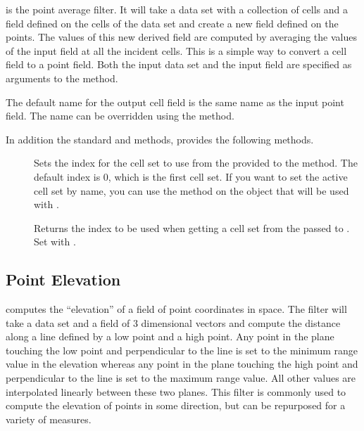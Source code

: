  is the point average filter.
It will take a data set with a collection of cells and a field defined on the cells of the data set and create a new field defined on the points.
The values of this new derived field are computed by averaging the values of the input field at all the incident cells.
This is a simple way to convert a cell field to a point field.
Both the input data set and the input field are specified as arguments to the  method.

The default name for the output cell field is the same name as the input point field.
The name can be overridden using the  method.

In addition the standard  and  methods,  provides the following methods.

\begin{description}
\item[]
  Sets the index for the cell set to use from the  provided to the  method.
  The default index is 0, which is the first cell set.
  If you want to set the active cell set by name, you can use the  method on the  object that will be used with .
\item[]
  Returns the index to be used when getting a cell set from the  passed to .
  Set with .
\end{description}


\subsection{Point Elevation}


 computes the ``elevation'' of a field of point
coordinates in space. The filter will take a data set and a field of 3
dimensional vectors and compute the distance along a line defined by a low
point and a high point. Any point in the plane touching the low point and
perpendicular to the line is set to the minimum range value in the
elevation whereas any point in the plane touching the high point and
perpendicular to the line is set to the maximum range value. All other
values are interpolated linearly between these two planes. This filter is
commonly used to compute the elevation of points in some direction, but can
be repurposed for a variety of measures.

